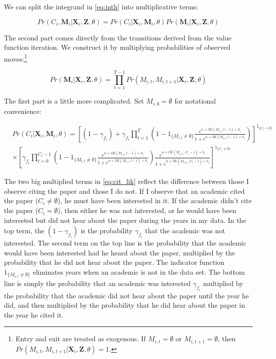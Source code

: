 We can split the integrand in \eqref{eq:inth} into multiplicative terms:

\begin{equation}
    Pr(C_i,\mathbf{M}_i|\mathbf{X}_i,\mathbf{Z}, \theta) = Pr(C_i|\mathbf{X}_i, \mathbf{M}_i, \theta) Pr(\mathbf{M}_i|\mathbf{X}_i, \mathbf{Z}, \theta)
\end{equation}

The second part comes directly from the transitions derived from the
value function iteration.  We construct it by multiplying probabilities of observed
moves:\footnote{Entry and exit are treated as exogenous.  If $M_{i,t} = \emptyset$ or $M_{i,t+1} = \emptyset$, then $Pr(M_{i,t}, M_{i,t+1}\vert \mathbf{X}_i, \mathbf{Z}, \theta) = 1$.}

\begin{equation}
    Pr(\mathbf{M}_i|\mathbf{X}_i,\mathbf{Z},\theta) = \prod_{t = 1}^{T-1} Pr(M_{i,t}, M_{i,t+1}\vert \mathbf{X}_i, \mathbf{Z}, \theta)
    \label{eq:mov_liks}
\end{equation}

The first part is a little more complicated. Set $M_{i,0} = \emptyset$ for notational convenience:

\begin{align}
    &Pr(C_i|\mathbf{X}_i, \mathbf{M}_i, \theta) = \left[\left(1 - \gamma_{f_{i}}\right) + \gamma_{f_{i}} \prod_{t=1}^T \left(1 - 1_{\{M_{i,t}\neq \emptyset\}} \frac{e^{\alpha + \beta K(M_{i,t},t-1) + h_i}}{1 + e^{\alpha + \beta K(M_{i,t},t-1) + h_i}}\right)\right]^{1_{\{C_i = \emptyset\}}} \nonumber \\
    &\times \left[\gamma_{f_{i}} \prod_{t=0}^{C_i - 1} \left(1 - 1_{\{M_{i,t}\neq \emptyset\}} \frac{e^{\alpha + \beta K(M_{i,t},t-1) + h_i}}{1 + e^{\alpha + \beta K(M_{i,t},t-1) + h_i}}\right) \frac{e^{\alpha + \beta K(M_{i,C_i},C_i-1) + h_i}}{1 + e^{\alpha + \beta K(M_{i,C_i},C_i-1) + h_i}}\right]^{1_{\{C_i \neq \emptyset\}}}
    \label{eq:cit_lik}
\end{align}

The two big multiplied terms in \eqref{eq:cit_lik} reflect the
difference between those I observe citing the paper and those I do not.
If I observe that an academic cited the paper ($C_i \neq \emptyset$), he must have been
interested in it. If the academic didn't cite the paper ($C_i = \emptyset$), then either he was not
interested, or he would have been interested but did not hear about the paper during 
the years in my data. In the top term, the $(1 - \gamma_{f_i})$ is the probability $\gamma_{f_i}$
that the academic was not interested. The second term on the top line is the probability that
the academic would have been interested had he heard about the paper,
multiplied by the probability that he did not hear about the paper.  The indicator function $1_{\{M_{i,t}\neq \emptyset\}}$
eliminates years when an academic is not in the data set.  The bottom line is
simply the probability that an academic was interested $\gamma_{f_i}$ multiplied
by the probability that the academic did not hear about the paper until
the year he did, and then multiplied by the probability that he did hear
about the paper in the year he cited it.

